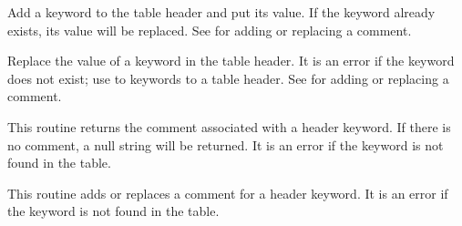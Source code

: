 Add a keyword to the table header and put its value.
If the keyword already exists, its value will be replaced.
See  for adding or replacing a comment.

\callseqtable

\begin{callseq}
\end{callseq}

Replace the value of a keyword in the table header.
It is an error if the keyword does not exist;
use  to  keywords to a table header.
See  for adding or replacing a comment.

\callseqtable

\begin{callseq}
\end{callseq}

This routine returns the comment associated with a header keyword.
If there is no comment, a null string will be returned.
It is an error if the keyword is not found in the table.

\callseqtable

\begin{callseq}
\end{callseq}

This routine adds or replaces a comment for a header keyword.
It is an error if the keyword is not found in the table.

\callseqtable

\begin{callseq}
\end{callseq}

